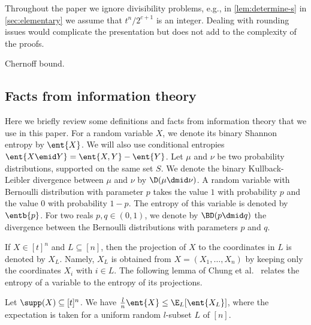 Throughout the paper we ignore divisibility problems, e.g., in
\autoref{lem:determine-s} in \autoref{sec:elementary} we assume
that $t^n/2^{c+1}$ is an integer. Dealing with rounding issues
would complicate the presentation but does not add to the
complexity of the proofs.
\begin{theorem}
Chernoff bound.
\end{theorem}

\subsection{Facts from information theory}
Here we briefly review some definitions and facts from
information theory that we use in this paper. For a random
variable $X$, we denote its binary Shannon entropy by $\ent{X}$.
We will also use conditional entropies $\ent{X\emid
Y}=\ent{X,Y}-\ent{Y}$. Let $\mu$ and $\nu$ be two probability
distributions, supported on the same set $S$. We denote the
binary Kullback-Leibler divergence between $\mu$ and $\nu$ by
$\D(\mu\dmid \nu)$. A random variable with Bernoulli
distribution with parameter $p$ takes the value $1$ with
probability $p$ and the value $0$ with probability $1-p$. The
entropy of this variable is denoted by $\entb{p}$. For two reals
$p,q\in (0,1)$, we denote by $\BD(p\dmid q)$ the divergence
between the Bernoulli distributions with parameters $p$ and $q$.

If $X\in[t]^n$ and $L\subseteq[n]$, then the projection of $X$
to the coordinates in $L$ is denoted by $X_L$. Namely, $X_L$ is
obtained from $X=(X_1,\ldots,X_n)$ by keeping only the
coordinates $X_i$ with $i\in L$. The following lemma of Chung et
al.~\cite{ChungGFS1986} relates the entropy of a variable to the
entropy of its projections.
\begin{lemma}
\label{lem:ent-subset}
Let $\supp(X)\subseteq[t]^n$. We have
$\frac{l}{n}\ent{X} \leq \E_L[\ent{X_L}]$, where the expectation is taken for
a uniform random $l$-subset $L$ of $[n]$.
\end{lemma}
